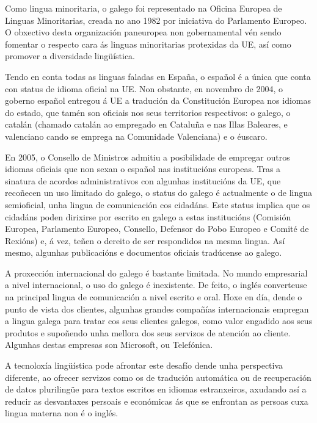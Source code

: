 \begin{multicols}{2}

Como lingua minoritaria, o galego foi representado na Oficina Europea de Linguas Minoritarias, creada no ano 1982 por iniciativa do Parlamento Europeo. O obxectivo desta organización paneuropea non gobernamental vén sendo fomentar o respecto cara ás linguas minoritarias protexidas da UE, así como promover a diversidade lingüística.

Tendo en conta todas as linguas faladas en España, o español é a única que conta con status de idioma oficial na UE. Non obstante, en novembro de 2004, o goberno español entregou á UE a tradución da Constitución Europea nos idiomas do estado, que tamén son oficiais nos seus territorios respectivos: o galego, o catalán (chamado catalán ao empregado en Cataluña e nas Illas Baleares, e valenciano cando se emprega na Comunidade Valenciana) e o éuscaro. 

En 2005, o Consello de Ministros admitiu a posibilidade de empregar outros idiomas oficiais que non sexan o español nas institucións europeas. Tras a sinatura de acordos administrativos con algunhas institucións da UE, que recoñecen un uso limitado do galego, o status do galego é actualmente o de lingua semioficial, unha lingua de comunicación cos cidadáns. Este status implica que os cidadáns poden dirixirse por escrito en galego a estas institucións (Comisión Europea, Parlamento Europeo, Consello, Defensor do Pobo Europeo e Comité de Rexións) e, á vez, teñen o dereito de ser respondidos na mesma lingua. Así mesmo, algunhas publicacións e documentos oficiais tradúcense ao galego. 

A proxección internacional do galego é bastante limitada. No mundo empresarial a nivel internacional, o uso do galego é inexistente. De feito, o inglés converteuse na principal lingua de comunicación a nivel escrito e oral. Hoxe en día, dende o punto de vista dos clientes, algunhas grandes compañías internacionais empregan a lingua galega para tratar cos seus clientes galegos, como valor engadido aos seus produtos e supoñendo unha mellora dos seus servizos de atención ao cliente. Algunhas destas empresas son Microsoft, ou Telefónica.

A tecnoloxía lingüística pode afrontar este desafío dende unha perspectiva diferente, ao ofrecer servizos como os de tradución automática ou de recuperación de datos plurilingüe para textos escritos en idiomas estranxeiros, axudando así a reducir as desvantaxes persoais e económicas ás que se enfrontan as persoas cuxa lingua materna non é o inglés.


\end{multicols}
